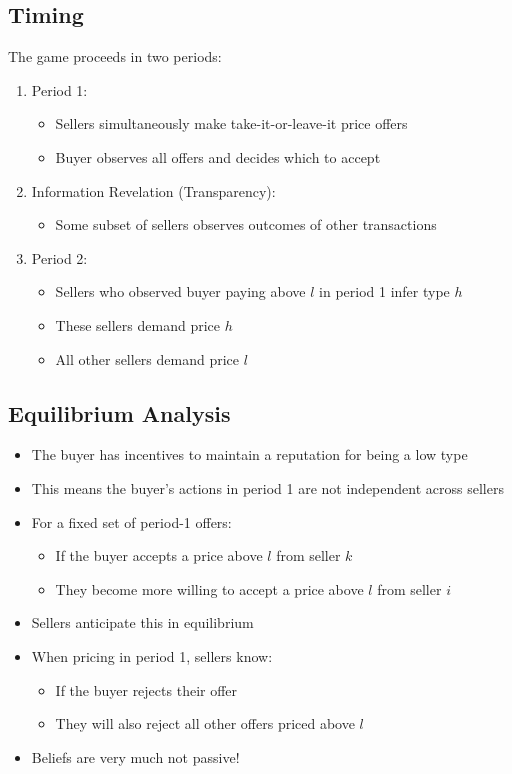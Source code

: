 \documentclass[11pt]{elegantbook_2}
\begin{document}
\subsection{Timing}
The game proceeds in two periods:

\begin{enumerate}
    \item Period 1:
    \begin{itemize}
        \item Sellers simultaneously make take-it-or-leave-it price offers
        \item Buyer observes all offers and decides which to accept
    \end{itemize}
    
    \item Information Revelation (Transparency):
    \begin{itemize}
        \item Some subset of sellers observes outcomes of other transactions
    \end{itemize}
    
    \item Period 2:
    \begin{itemize}
        \item Sellers who observed buyer paying above $l$ in period 1 infer type $h$
        \item These sellers demand price $h$
        \item All other sellers demand price $l$
    \end{itemize}
\end{enumerate}


\subsection{Equilibrium Analysis}
\begin{itemize}
    \item The buyer has incentives to maintain a reputation for being a low type
    \item This means the buyer's actions in period 1 are not independent across sellers
    \item For a fixed set of period-1 offers:
    \begin{itemize}
        \item If the buyer accepts a price above $l$ from seller $k$
        \item They become more willing to accept a price above $l$ from seller $i$
    \end{itemize}
    \item Sellers anticipate this in equilibrium
    \item When pricing in period 1, sellers know:
    \begin{itemize}
        \item If the buyer rejects their offer
        \item They will also reject all other offers priced above $l$
    \end{itemize}
    \item Beliefs are very much not passive!
\end{itemize}
\end{document}
